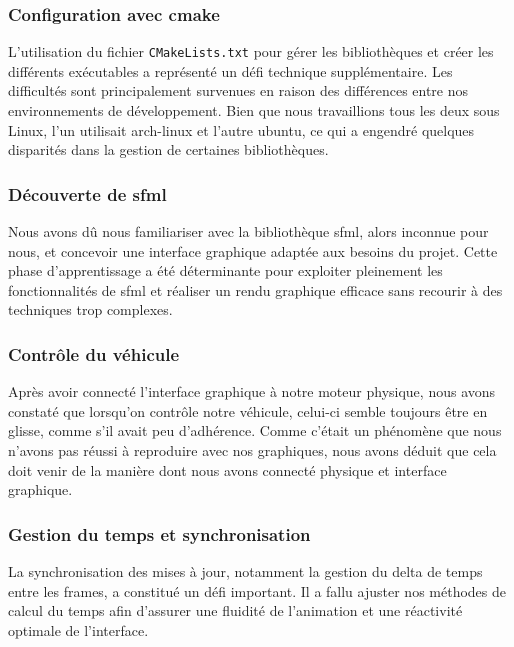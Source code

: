 \subsubsection{Configuration avec \gls{cmake}}\label{subsubsec:cmake}
L'utilisation du fichier \texttt{CMakeLists.txt} pour gérer les bibliothèques et créer les différents exécutables a représenté un défi technique supplémentaire.
Les difficultés sont principalement survenues en raison des différences entre nos environnements de développement.
Bien que nous travaillions tous les deux sous Linux, l'un utilisait \gls{arch-linux} et l'autre \gls{ubuntu}, ce qui a engendré quelques disparités dans la gestion de certaines bibliothèques.

\subsubsection{Découverte de \gls{sfml}}\label{subsubsec:sfml}
Nous avons dû nous familiariser avec la bibliothèque \gls{sfml}, alors inconnue pour nous, et concevoir une interface graphique adaptée aux besoins du projet.
Cette phase d'apprentissage a été déterminante pour exploiter pleinement les fonctionnalités de \gls{sfml} et réaliser un rendu graphique efficace sans recourir à des techniques trop complexes.

\subsubsection{Contrôle du véhicule}\label{subsubsec:ctrlVehicule}
Après avoir connecté l'interface graphique à notre moteur physique, nous avons constaté que lorsqu'on contrôle notre véhicule, celui-ci semble toujours être en glisse, comme s'il avait peu d'adhérence.
Comme c'était un phénomène que nous n'avons pas réussi à reproduire avec nos graphiques, nous avons déduit que cela doit venir de la manière dont nous avons connecté physique et interface graphique.

\subsubsection{Gestion du temps et synchronisation}\label{subsubsec:la-gestion-du-temps}
La synchronisation des mises à jour, notamment la gestion du delta de temps entre les frames, a constitué un défi important.
Il a fallu ajuster nos méthodes de calcul du temps afin d’assurer une fluidité de l’animation et une réactivité optimale de l’interface.


